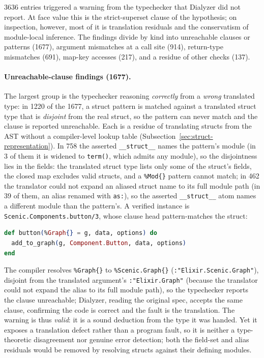 \num{3636} entries triggered a warning from the typechecker that Dialyzer did not report.
At face value this is the strict-superset clause of the hypothesis; on inspection, however, most of it is translation residuals and the conservatism of module-local inference.
The findings divide by kind into unreachable clauses or patterns (\num{1677}), argument mismatches at a call site (914), return-type mismatches (691), map-key accesses (217), and a residue of other checks (137).

\paragraph{Unreachable-clause findings (\num{1677}).}
The largest group is the typechecker reasoning \emph{correctly} from a \emph{wrong} translated type: in \num{1220} of the \num{1677}, a struct pattern is matched against a translated struct type that is \emph{disjoint} from the real struct, so the pattern can never match and the clause is reported unreachable. Each is a residue of translating structs from the AST without a compiler-level lookup table (Subsection~\ref{sec:struct-representation}).
In 758 the asserted \texttt{\_\_struct\_\_} names the pattern's module (in 3 of them it is widened to \texttt{term()}, which admits any module), so the disjointness lies in the fields: the translated struct type lists only some of the struct's fields, the closed map excludes valid structs, and a \texttt{\%Mod\{\}} pattern cannot match; in 462 the translator could not expand an aliased struct name to its full module path (in 39 of them, an alias renamed with \texttt{as:}), so the asserted \texttt{\_\_struct\_\_} atom names a different module than the pattern's.
A verified instance is \texttt{Scenic.Components.button/3}, whose clause head pattern-matches the struct:
\begin{lstlisting}[language=Elixir, firstnumber=last]
def button(%Graph{} = g, data, options) do
  add_to_graph(g, Component.Button, data, options)
end
\end{lstlisting}
The compiler resolves \texttt{\%Graph\{\}} to \texttt{\%Scenic.Graph\{\}} (\texttt{:"Elixir.Scenic.Graph"}), disjoint from the translated argument's \texttt{:"Elixir.Graph"} (because the translator could not expand the alias to its full module path), so the typechecker reports the clause unreachable; Dialyzer, reading the original spec, accepts the same clause, confirming the code is correct and the fault is the translation.
The warning is thus \emph{valid}: it is a sound deduction from the type it was handed. Yet it exposes a translation defect rather than a program fault, so it is neither a type-theoretic disagreement nor genuine error detection; both the field-set and alias residuals would be removed by resolving structs against their defining modules.
